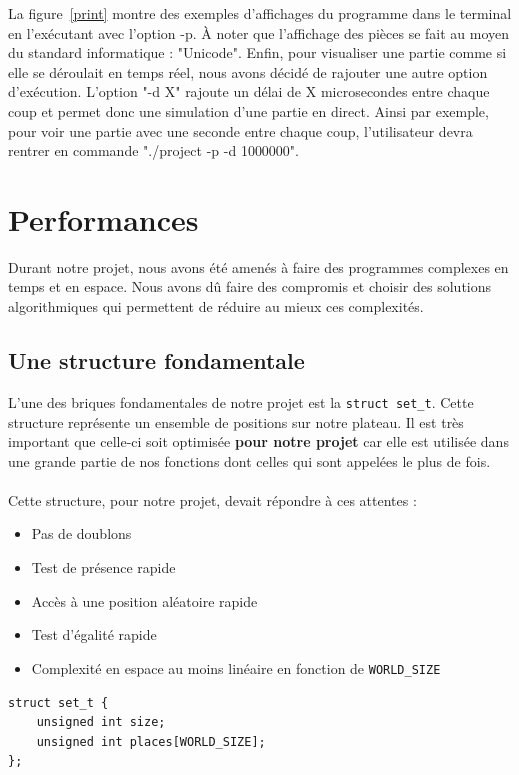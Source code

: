 \documentclass{article}
\begin{document}
La figure~\ref{print} montre des exemples d'affichages du programme dans le terminal en l'exécutant avec l'option -p. À noter
que l'affichage des pièces se fait au moyen du standard informatique : "Unicode".
\newline
\newline
Enfin, pour visualiser une partie comme si elle se déroulait en temps réel, nous avons décidé de rajouter une autre option d'exécution.
L'option "-d X" rajoute un délai de X microsecondes entre chaque coup et permet donc une simulation d'une partie en direct. Ainsi par exemple, pour voir une
partie avec une seconde entre chaque coup, l'utilisateur devra rentrer en commande "./project -p -d 1000000".

\newpage
\section{Performances} 

Durant notre projet, nous avons été amenés à faire des programmes complexes en temps et en espace.
Nous avons dû faire des compromis et choisir des solutions algorithmiques qui permettent de réduire au mieux ces complexités.

\subsection{Une structure fondamentale}

L'une des briques fondamentales de notre projet est la \lstinline{struct set_t}.
Cette structure représente un ensemble de positions sur notre plateau.
Il est très important que celle-ci soit optimisée \textbf{pour notre projet} car elle est utilisée dans une grande partie de nos fonctions dont celles qui sont appelées le plus de fois.
\\\\
Cette structure, pour notre projet, devait répondre à ces attentes :
\begin{itemize}
    \item Pas de doublons
    \item Test de présence rapide
    \item Accès à une position aléatoire rapide
    \item Test d'égalité rapide
    \item Complexité en espace au moins linéaire en fonction de \lstinline{WORLD_SIZE}
\end{itemize}

\begin{lstlisting}[caption=set\_t]
struct set_t {
    unsigned int size;
    unsigned int places[WORLD_SIZE];
};
\end{lstlisting}
\end{document}
